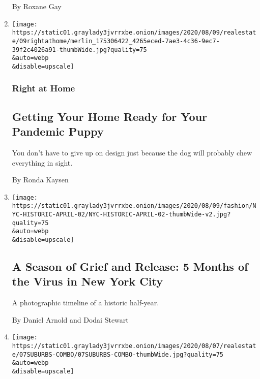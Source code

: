\begin{enumerate}
  By Roxane Gay
\item
  \href{/2020/08/07/realestate/pandemic-puppy-home-design.html}{}

  \texttt{[image: https://static01.graylady3jvrrxbe.onion/images/2020/08/09/realestate/09rightathome/merlin\_175306422\_4265eced-7ae3-4c36-9ec7-39f2c4026a91-thumbWide.jpg?quality=75\\\&auto=webp\\\&disable=upscale]}

  \hypertarget{right-at-home}{%
  \subsubsection{Right at Home}\label{right-at-home}}

  \hypertarget{getting-your-home-ready-for-your-pandemic-puppy}{%
  \subsection{Getting Your Home Ready for Your Pandemic
  Puppy}\label{getting-your-home-ready-for-your-pandemic-puppy}}

  You don't have to give up on design just because the dog will probably
  chew everything in sight.

  By Ronda Kaysen
\item
  \href{/2020/08/07/style/coronavirus-nyc-historic-season.html}{}

  \texttt{[image: https://static01.graylady3jvrrxbe.onion/images/2020/08/09/fashion/NYC-HISTORIC-APRIL-02/NYC-HISTORIC-APRIL-02-thumbWide-v2.jpg?quality=75\\\&auto=webp\\\&disable=upscale]}

  \hypertarget{a-season-of-grief-and-release-5-months-of-the-virus-in-new-york-city-1}{%
  \subsection{A Season of Grief and Release: 5 Months of the Virus in
  New York
  City}\label{a-season-of-grief-and-release-5-months-of-the-virus-in-new-york-city-1}}

  A photographic timeline of a historic half-year.

  By Daniel Arnold and Dodai Stewart
\item
  \href{/2020/08/07/realestate/coronavirus-escape-suburbs-new-york.html}{}

  \texttt{[image: https://static01.graylady3jvrrxbe.onion/images/2020/08/07/realestate/07SUBURBS-COMBO/07SUBURBS-COMBO-thumbWide.jpg?quality=75\\\&auto=webp\\\&disable=upscale]}

  \hypertarget{leaving-new-york-how-to-choose-the-right-suburb}{%
}
\end{enumerate}
